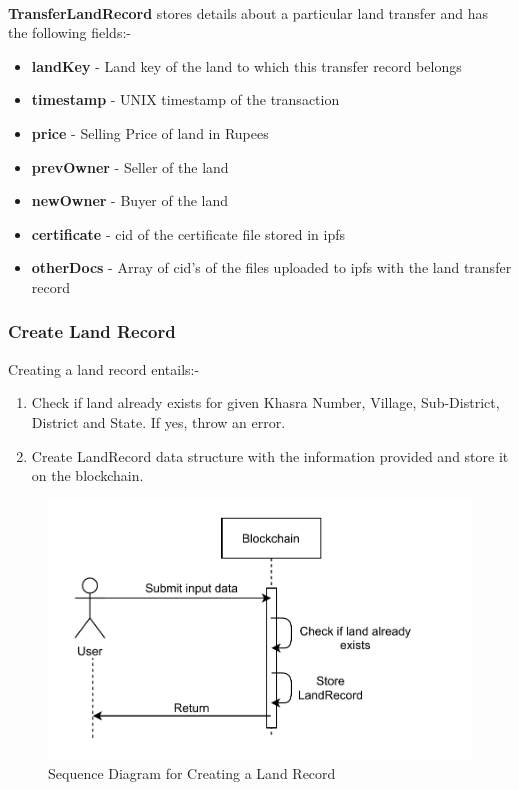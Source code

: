 \documentclass[12pt]{article}
\begin{document}
        \paragraph{}
        \textbf{TransferLandRecord} stores details about a particular land transfer and has the following fields:-
        \begin{itemize}
            \item \textbf{landKey} - Land key of the land to which this transfer record belongs
            \item \textbf{timestamp} - UNIX timestamp of the transaction
            \item \textbf{price} - Selling Price of land in Rupees
            \item \textbf{prevOwner} - Seller of the land
            \item \textbf{newOwner} - Buyer of the land
            \item \textbf{certificate} - \acrshort{cid} of the certificate file stored in \acrshort{ipfs}
            \item \textbf{otherDocs} - Array of \acrshort{cid}'s of the files uploaded to \acrshort{ipfs} with the land transfer record
        \end{itemize}

    \subsubsection{Create Land Record}
        Creating a land record entails:-
        \begin{enumerate}
            \item Check if land already exists for given Khasra Number, Village, Sub-District, District and State. If yes, throw an error.
            \item Create LandRecord data structure with the information provided and store it on the blockchain.
        \end{enumerate}

        \begin{figure}[H]
            \includegraphics[scale=0.25]{blockchain_seq_create_land}
            \centering
            \caption{Sequence Diagram for Creating a Land Record}
        \end{figure}
\end{document}
